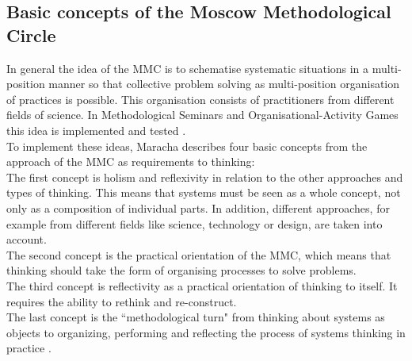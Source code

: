 \documentclass[11pt,a4paper]{article}
\begin{document}
\subsection{Basic concepts of the Moscow Methodological Circle}
In general the idea of the MMC is to schematise systematic situations in a multi-position manner so that collective problem solving as multi-position organisation of practices is possible. This organisation consists of practitioners from different fields of science. In Methodological Seminars and Organisational-Activity Games this idea is implemented and tested \cite[p. 269ff.]{Maracha2018}. \\
To implement these ideas, Maracha describes four basic concepts from the approach of the MMC as requirements to thinking: \\
The first concept is holism and reflexivity in relation to the other approaches and types of thinking. This means that systems must be seen as a whole concept, not only as a composition of individual parts. In addition, different approaches, for example from different fields like science, technology or design, are taken into account. \\
The second concept is the practical orientation of the MMC, which means that thinking should take the form of organising processes to solve problems. \\
The third concept is reflectivity as a practical orientation of thinking to itself. It requires the ability to rethink and re-construct. \\
The last concept is the “methodological turn" from thinking about systems as objects to organizing, performing and reflecting the process of systems thinking in practice \cite[p. 270]{Maracha2018}. 
\end{document}
